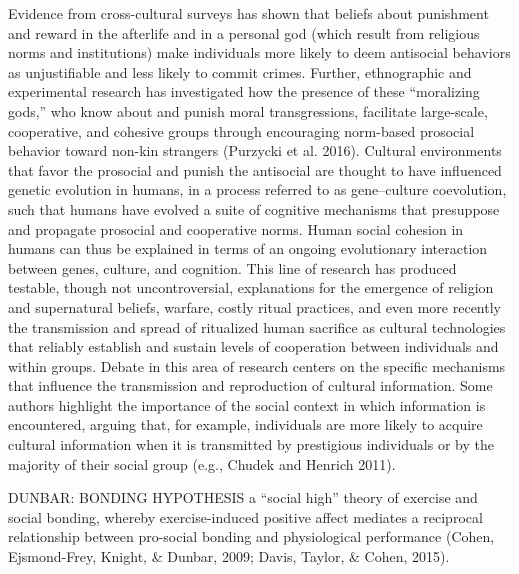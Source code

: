 Evidence from cross-cultural surveys has shown that beliefs about punishment and reward in the afterlife and in a personal god (which result from religious norms and institutions) make individuals more likely to deem antisocial behaviors as unjustifiable and less likely to commit crimes. Further, ethnographic and experimental research has investigated how the presence of these “moralizing gods,” who know about and punish moral transgressions, facilitate large-scale, cooperative, and cohesive groups through encouraging norm-based prosocial behavior toward non-kin strangers (Purzycki et al. 2016). Cultural environments that favor the prosocial and punish the antisocial are thought to have influenced genetic evolution in humans, in a process referred to as gene–culture coevolution, such that humans have evolved a suite of cognitive mechanisms that presuppose and propagate prosocial and cooperative norms.
Human social cohesion in humans can thus be explained in terms of an ongoing evolutionary interaction between genes, culture, and cognition. This line of research has produced testable, though not uncontroversial, explanations for the emergence of religion and supernatural beliefs, warfare, costly ritual practices, and even more recently the transmission and spread of ritualized human sacrifice as cultural technologies that reliably establish and sustain levels of cooperation between individuals and within groups. Debate in this area of research centers on the specific mechanisms that influence the transmission and reproduction of cultural information. Some authors highlight the importance of the social context in which information is encountered, arguing that, for example, individuals are more likely to acquire cultural information when it is transmitted by prestigious individuals or by the majority of their social group (e.g., Chudek and Henrich 2011).





















DUNBAR: BONDING HYPOTHESIS
a ``social high'' theory of exercise and social bonding, whereby exercise-induced positive affect mediates a reciprocal relationship between pro-social bonding and physiological performance (Cohen, Ejsmond-Frey, Knight, & Dunbar, 2009; Davis, Taylor, & Cohen, 2015).

